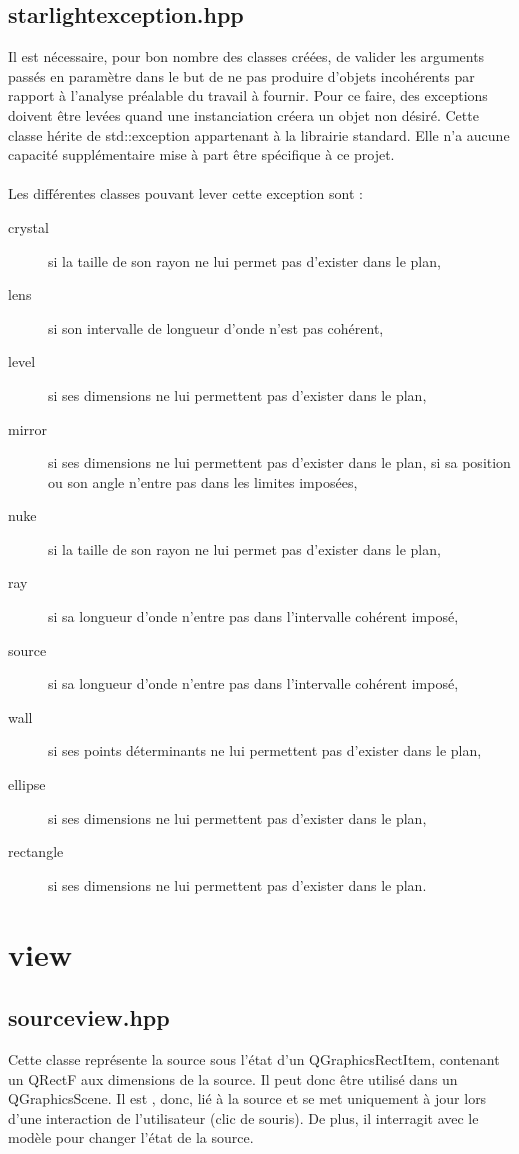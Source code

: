 \documentclass[a4paper,11pt]{report}
\begin{document}
\subsection[Exception Starlight]{starlightexception.hpp}
Il est nécessaire, pour bon nombre des classes créées, de valider les arguments passés en
paramètre dans le but de ne pas produire d'objets incohérents par rapport à
l'analyse préalable du travail à fournir. Pour ce faire, des exceptions doivent
être levées quand une instanciation créera un objet non désiré. 
Cette classe hérite de std::exception appartenant à la librairie standard. Elle n'a aucune
capacité supplémentaire mise à part être spécifique à ce projet. \\ \\

Les différentes classes pouvant lever cette exception sont :
\begin{description}
	\item[crystal] si la taille de son rayon ne lui permet pas d'exister dans le
		plan,
	\item[lens] si son intervalle de longueur d'onde n'est pas cohérent,
	\item[level] si ses dimensions ne lui permettent pas d'exister dans le plan,
	\item[mirror] si ses dimensions ne lui permettent pas d'exister dans le
		plan, si sa position ou son angle n'entre pas dans les limites imposées,
	\item[nuke] si la taille de son rayon ne lui permet pas d'exister dans le
		plan,
	\item[ray] si sa longueur d'onde n'entre pas dans l'intervalle cohérent
		imposé,
	\item[source] si sa longueur d'onde n'entre pas dans l'intervalle cohérent
		imposé,
	\item[wall] si ses points déterminants ne lui permettent pas d'exister dans
		le plan,
	\item[ellipse] si ses dimensions ne lui permettent pas d'exister dans le
		plan,
	\item[rectangle] si ses dimensions ne lui permettent pas d'exister dans le
		plan.
\end{description}
\section[Les objets visuels]{view}

\subsection[La source]{sourceview.hpp}
Cette classe représente la source sous l'état d'un QGraphicsRectItem, contenant
un QRectF aux dimensions de la source. Il peut donc être utilisé dans un 
QGraphicsScene. Il est , donc, lié à la source et se met uniquement à jour 
lors d'une interaction de l'utilisateur (clic de souris). De plus, il interragit
avec le modèle pour changer l'état de la source.
\end{document}
